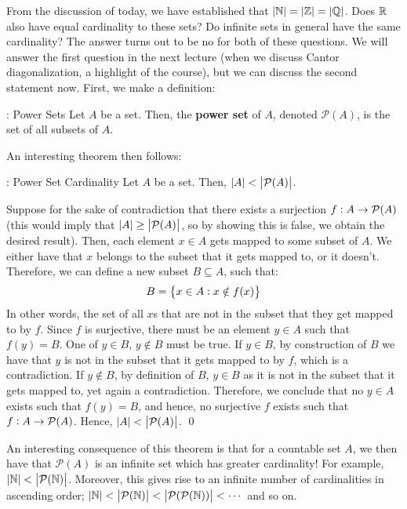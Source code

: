 From the discussion of today, we have established that $\abs{\mathbb{N}} = \abs{\mathbb{Z}} = \abs{\mathbb{Q}}$. Does $\mathbb{R}$ also have equal cardinality to these sets? Do infinite sets in general have the same cardinality? The answer turns out to be no for both of these questions. We will answer the first question in the next lecture (when we discuss Cantor diagonalization, a highlight of the course), but we can discuss the second statement now. First, we make a definition:
\begin{ndef}{: Power Sets}
    Let $A$ be a set. Then, the \textbf{power set} of $A$, denoted $\mathcal{P}(A)$, is the set of all subsets of $A$. 
\end{ndef}
\noindent An interesting theorem then follows:
\begin{ntheorem}{: Power Set Cardinality}
    Let $A$ be a set. Then, $\abs{A} < \abs{\mathcal{P}(A)}$.
\end{ntheorem}
\begin{nproof}
    Suppose for the sake of contradiction that there exists a surjection $f: A\rightarrow \mathcal{P}({A})$ (this would imply that $\abs{A} \geq \abs{\mathcal{P}({A})}$, so by showing this is false, we obtain the desired result). Then, each element $x \in A$ gets mapped to some subset of $A$. We either have that $x$ belongs to the subset that it gets mapped to, or it doesn't. Therefore, we can define a new subset $B \subseteq A$, such that:
    \[B = \set{x\in A: x \notin f(x)}\]
    In other words, the set of all $x$s that are not in the subset that they get mapped to by $f$. Since $f$ is surjective, there must be an element $y \in A$ such that $f(y) = B$. One of $y \in B$, $y \notin B$ must be true. If $y \in B$, by construction of $B$ we have that $y$ is not in the subset that it gets mapped to by $f$, which is a contradiction. If $y \notin B$, by definition of $B$, $y \in B$ as it is not in the subset that it gets mapped to, yet again a contradiction. Therefore, we conclude that no $y \in A$ exists such that $f(y) = B$, and hence, no surjective $f$ exists such that $f: A \rightarrow \mathcal{P}({A})$. Hence, $\abs{A} < \abs{\mathcal{P}({A})}$. \qed
\end{nproof}
\noindent An interesting consequence of this theorem is that for a countable set $A$, we then have that $\mathcal{P}(A)$ is an infinite set which has greater cardinality! For example, $\abs{\mathbb{N}} < \abs{\mathcal{P}(\mathbb{N})}$. Moreover, this gives rise to an infinite number of cardinalities in ascending order; $\abs{\mathbb{N}} < \abs{\mathcal{P}({\mathbb{N}})} < \abs{\mathcal{P}({\mathcal{P}({\mathbb{N}})})} < \cdots$ and so on.

